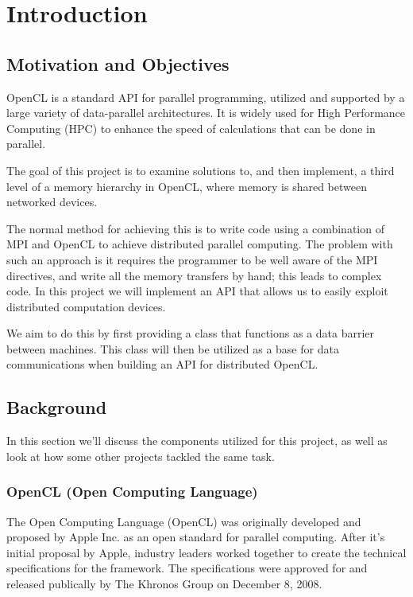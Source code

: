 \documentclass[../thesis.tex]{subfiles}
\begin{document}
\chapter{Introduction}

\section{Motivation and Objectives}
    OpenCL is a standard API for parallel programming, utilized and supported by a large variety of data-parallel architectures. It is widely used for High Performance Computing (HPC) to enhance the speed of calculations that can be done in parallel.

    The goal of this project is to examine solutions to, and then implement, a third level of a memory hierarchy in OpenCL, where memory is shared between networked devices.

    The normal method for achieving this is to write code using a combination of MPI and OpenCL to achieve distributed parallel computing. The problem with such an approach is it requires the programmer to be well aware of the MPI directives, and write all the memory transfers by hand; this leads to complex code. In this project we will implement an API that allows us to easily exploit distributed computation devices. 

    We aim to do this by first providing a class that functions as a data barrier between machines. This class will then be utilized as a base for data communications when building an API for distributed OpenCL.


\section{Background}
    In this section we'll discuss the components utilized for this project, as well as look at how some other projects tackled the same task.

    \subsection{OpenCL (Open Computing Language)} %
    \label{sub:opencl}
        The Open Computing Language (OpenCL) was originally developed and proposed by Apple Inc. as an open standard for parallel computing. After it's initial proposal by Apple, industry leaders worked together to create the technical specifications for the framework. The specifications were approved for and released publically by The Khronos Group on December 8, 2008\cite{opencl10pressrelease}.
\end{document}
